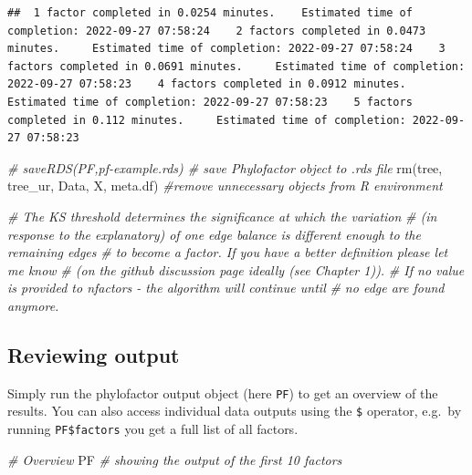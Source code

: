 \documentclass[
]{book}
\newenvironment{Shaded}{\begin{snugshade}}{\end{snugshade}}
\newcommand{\CommentTok}[1]{\textcolor[rgb]{0.56,0.35,0.01}{\textit{#1}}}
\newcommand{\FunctionTok}[1]{\textcolor[rgb]{0.00,0.00,0.00}{#1}}
\newcommand{\NormalTok}[1]{#1}
\begin{document}
\begin{verbatim}
##  1 factor completed in 0.0254 minutes.    Estimated time of completion: 2022-09-27 07:58:24    2 factors completed in 0.0473 minutes.     Estimated time of completion: 2022-09-27 07:58:24    3 factors completed in 0.0691 minutes.     Estimated time of completion: 2022-09-27 07:58:23    4 factors completed in 0.0912 minutes.     Estimated time of completion: 2022-09-27 07:58:23    5 factors completed in 0.112 minutes.     Estimated time of completion: 2022-09-27 07:58:23   
\end{verbatim}

\begin{Shaded}
\begin{Highlighting}[]
\CommentTok{\# saveRDS(PF,\textquotesingle{}pf{-}example.rds\textquotesingle{})  \# save Phylofactor object to .rds file }
\FunctionTok{rm}\NormalTok{(tree, tree\_ur, Data, X, meta.df) }\CommentTok{\#remove unnecessary objects from R environment}

\CommentTok{\# The KS threshold determines the significance at which the variation }
\CommentTok{\# (in response to the explanatory) of one edge balance is different enough to the remaining edges }
\CommentTok{\# to become a factor. If you have a better definition please let me know }
\CommentTok{\# (on the github discussion page ideally (see Chapter 1)).   }
\CommentTok{\# If no value is provided to nfactors {-} the algorithm will continue until }
\CommentTok{\# no edge are found anymore.}
\end{Highlighting}
\end{Shaded}

\hypertarget{reviewing-output}{%
\subsection{Reviewing output}\label{reviewing-output}}

Simply run the phylofactor output object (here \texttt{PF}) to get an overview of the results. You can also access individual data outputs using the \texttt{\$} operator, e.g.~by running \texttt{PF\$factors} you get a full list of all factors.

\begin{Shaded}
\begin{Highlighting}[]
\CommentTok{\# Overview}
\NormalTok{PF }\CommentTok{\# showing the output of the first 10 factors }
\end{Highlighting}
\end{Shaded}
\end{document}
